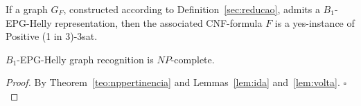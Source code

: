 \documentclass[runningheads]{llncs}
\begin{document}
\begin{lemma}\label{lem:volta}
If a graph $G_F$, constructed according to Definition~\ref{sec:reducao}, admits a $B_1$-EPG-Helly representation, then the associated CNF-formula $F$ is a yes-instance of {\sc Positive (1 in 3)-3sat}.
\end{lemma}










\begin{theorem}
{\sc $B_{1}$-EPG-Helly graph recognition} is $NP$-complete.
\end{theorem}
\begin{proof} %
By Theorem~\ref{teo:nppertinencia} and Lemmas~\ref{lem:ida} and~\ref{lem:volta}.
$\square$ \end{proof}
\end{document}

